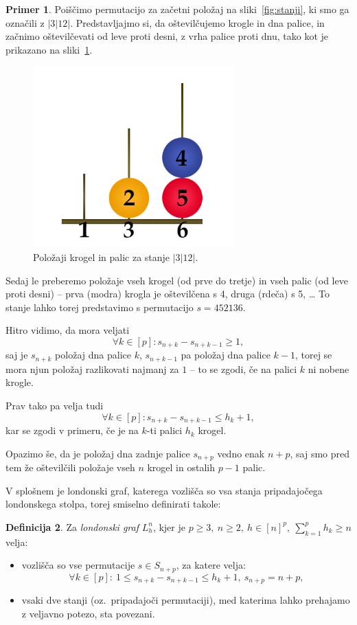 \documentclass[12pt,a4paper]{amsart}
\theoremstyle{definition} %
\newtheorem{definicija}{Definicija}[section]
\newtheorem{primer}[definicija]{Primer}
\theoremstyle{plain} %
\begin{document}
\begin{primer}
    Poiščimo permutacijo za začetni položaj na sliki~\ref{fig:stanji}, ki smo ga označili z $|3|12|$. 
    Predstavljajmo si, da oštevilčujemo krogle in dna palice, in začnimo oštevilčevati od leve proti desni, z vrha palice proti dnu, tako kot je prikazano na sliki~\ref{fig:ostev-stanji}.
    
    \begin{figure}[h]
        \includegraphics[width=220pt]{img/london-tower-numbered.png}
        \caption{Položaji krogel in palic za stanje $|3|12|$.}
        \label{fig:ostev-stanji}
    \end{figure}
    
    Sedaj le preberemo položaje vseh krogel (od prve do tretje) in vseh palic (od leve proti desni) -- prva (modra) krogla je oštevilčena s 4, druga (rdeča) s 5, \ldots
    To stanje lahko torej predstavimo s permutacijo $s=452136$.
\end{primer}

Hitro vidimo, da mora veljati 
\[\forall k \in [p]\colon s_{n+k} - s_{n+k-1} \geq 1, \]
saj je $s_{n+k}$ položaj dna palice $k$, $s_{n+k-1}$ pa položaj dna palice $k-1$, torej se mora njun položaj razlikovati najmanj za $1$ -- to se zgodi, če na palici $k$ ni nobene krogle.

Prav tako pa velja tudi 
\[\forall k \in [p]\colon s_{n+k} - s_{n+k-1} \leq h_k + 1,\]
kar se zgodi v primeru, če je na $k$-ti palici $h_k$ krogel.

Opazimo še, da je položaj dna zadnje palice $s_{n+p}$ vedno enak $n+p$, saj smo pred tem že oštevilčili položaje vseh $n$ krogel in ostalih $p-1$ palic.

V splošnem je londonski graf, katerega vozlišča so vsa stanja pripadajočega londonskega stolpa, torej smiselno definirati takole:

\begin{definicija}
    Za \emph{londonski graf} $L_h^n$, kjer je $p \geq 3,\ n \geq 2,\ h \in [n]^p,\  \sum_{k=1}^p h_k \geq n$ velja:
    \begin{itemize}
        \item vozlišča so vse permutacije $s \in S_{n+p}$, za katere velja:
        \[\forall k \in [p]:\ 1 \leq s_{n+k} - s_{n+k-1} \leq h_k + 1,\ s_{n+p} = n + p ,\]
        \item vsaki dve stanji (oz.\ pripadajoči permutaciji), med katerima lahko prehajamo z veljavno potezo, sta povezani.
    \end{itemize}
\end{definicija}
\end{document}
